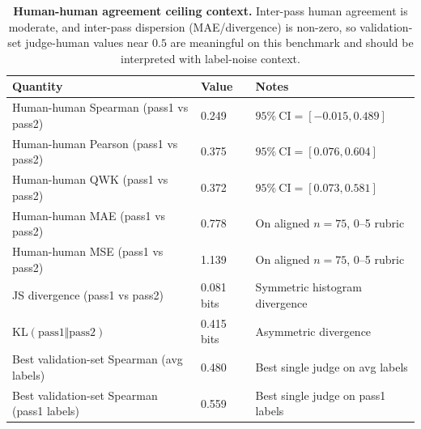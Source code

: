 \documentclass{article}
\begin{document}
\begin{table}[t]
  \centering
  \small
  \begin{tabular}{@{}p{}p{}p{}@{}}
    \toprule
    \textbf{Quantity}                           & \textbf{Value} & \textbf{Notes}                      \\
    \midrule
    Human-human Spearman (pass1 vs pass2)       & 0.249          & \(95\%\ \text{CI}=[-0.015, 0.489]\) \\
    Human-human Pearson (pass1 vs pass2)        & 0.375          & \(95\%\ \text{CI}=[0.076, 0.604]\)  \\
    Human-human QWK (pass1 vs pass2)            & 0.372          & \(95\%\ \text{CI}=[0.073, 0.581]\)  \\
    Human-human MAE (pass1 vs pass2)            & 0.778          & On aligned \(n=75\), 0--5 rubric    \\
    Human-human MSE (pass1 vs pass2)            & 1.139          & On aligned \(n=75\), 0--5 rubric    \\
    JS divergence (pass1 vs pass2)              & 0.081 bits     & Symmetric histogram divergence      \\
    KL\((\text{pass1}\Vert\text{pass2})\)       & 0.415 bits     & Asymmetric divergence               \\
    Best validation-set Spearman (avg labels)   & 0.480          & Best single judge on avg labels     \\
    Best validation-set Spearman (pass1 labels) & 0.559          & Best single judge on pass1 labels   \\
    \bottomrule
  \end{tabular}
  \caption{\textbf{Human-human agreement ceiling context.}
    Inter-pass human agreement is moderate, and inter-pass dispersion (MAE/divergence) is non-zero, so validation-set judge-human values near \(0.5\) are meaningful on this benchmark and should be interpreted with label-noise context.}
  \label{tab:app-human-human-ceiling}
\end{table}
\end{document}
